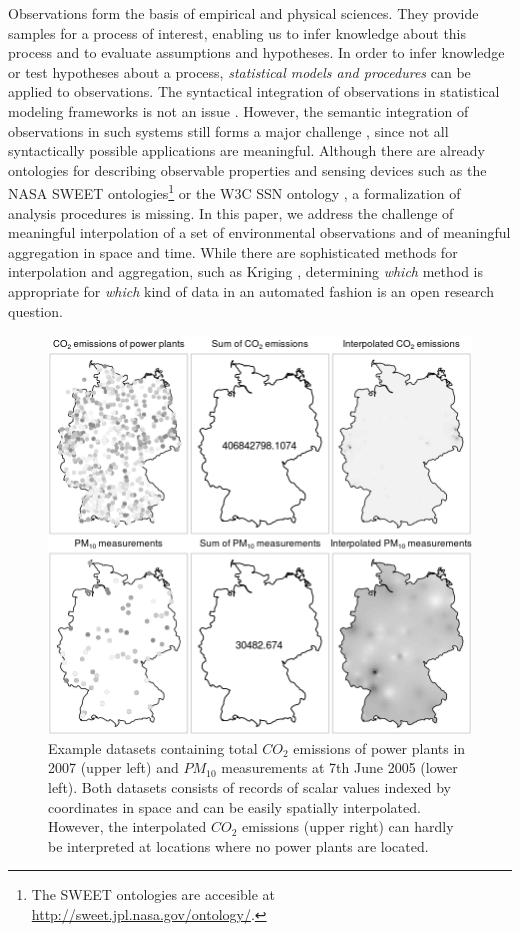 \documentclass[final,authoryear,1p,times]{elsarticle}
\begin{document}
Observations form the basis of empirical and physical sciences. They provide samples for a process of interest, enabling us to infer knowledge about this process and to evaluate assumptions and hypotheses. In order to infer knowledge or test hypotheses about a process, \textit{statistical models and procedures} can be applied to observations. The syntactical integration of observations in statistical modeling frameworks is not an issue \citep{R}. However, the semantic integration of observations in such systems still forms a major challenge \citep{Sheth2008}, since not all syntactically possible applications are meaningful. Although there are already ontologies for describing observable properties and sensing devices such as the NASA SWEET ontologies\footnote{The SWEET ontologies are accesible at \url{http://sweet.jpl.nasa.gov/ontology/}.} or the W3C SSN ontology \citep{Compton2012}, a formalization of analysis procedures is missing. In this paper, we address the challenge of meaningful interpolation of a set of environmental observations and of meaningful aggregation in space and time. While there are sophisticated methods for interpolation and aggregation, such as Kriging \citep{Journel1978}, determining \textit{which} method is appropriate for \textit{which} kind of data in an automated fashion is an open research question. 

\begin{figure}[ht]
	\centering
		\includegraphics[width=12cm]{intro.png}
	\caption{Example datasets containing total $CO_2$ emissions of power plants in 2007 (upper left) and $PM_{10}$ measurements at 7th June 2005 (lower left). Both datasets consists of records of scalar values indexed by coordinates in space and can be easily spatially interpolated. However, the interpolated $CO_{2}$ emissions (upper right) can hardly be interpreted at locations where no power plants are located.}
	\label{fig:intro}
\end{figure} 
\end{document}
